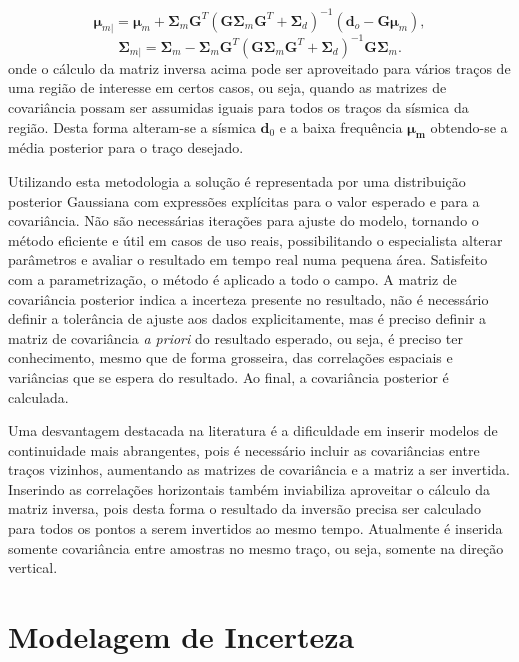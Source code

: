 \begin{equation}
\label{eqn:mapSolution}
\boldsymbol{\mu}_{m|} = \boldsymbol{\mu}_{m} + \boldsymbol{\Sigma}_{m}\boldsymbol{G}^{T}(\boldsymbol{G\Sigma}_{m}\boldsymbol{G}^{T}+\boldsymbol{\Sigma}_{d})^{-1}\left ( \boldsymbol{d}_{o} - \boldsymbol{G\mu}_{m} \right ),
\end{equation}
\begin{equation}
\boldsymbol{\Sigma}_{m|} = \boldsymbol{\Sigma}_{m} - \boldsymbol{\Sigma}_{m}\boldsymbol{G}^{T}(\boldsymbol{G\Sigma}_{m}\boldsymbol{G}^{T}+\boldsymbol{\Sigma}_{d})^{-1}\boldsymbol{G\Sigma}_{m}.
\end{equation} 
onde o cálculo da matriz inversa acima pode ser aproveitado para vários traços
de uma região de interesse em certos casos, ou seja, quando as matrizes de
covariância possam ser assumidas iguais para todos os traços da sísmica da região.
Desta forma alteram-se a sísmica $\mathbf{d}_0$ e a baixa frequência
$\boldsymbol{\mu_m}$ obtendo-se a média posterior para o traço desejado.


Utilizando esta metodologia a solução é representada por uma distribuição
posterior Gaussiana com expressões explícitas para o valor esperado e para a
covariância. Não são necessárias iterações para ajuste do modelo, tornando o
método eficiente e útil em casos de uso reais, possibilitando o especialista
alterar parâmetros e avaliar o resultado em tempo real numa pequena área.
Satisfeito com a parametrização, o método é aplicado a todo o campo. A matriz de
covariância posterior indica a incerteza presente no resultado, não é necessário
definir a tolerância de ajuste aos dados explicitamente, mas é preciso definir a
matriz de covariância \textit{a priori} do resultado esperado, ou seja, é
preciso ter conhecimento, mesmo que de forma grosseira, das correlações espaciais e
variâncias que se espera do resultado. Ao final, a covariância posterior é
calculada.

Uma desvantagem destacada na literatura é a dificuldade em inserir modelos de
continuidade mais abrangentes, pois é necessário incluir as covariâncias entre
traços vizinhos, aumentando as matrizes de covariância e a matriz a ser
invertida. Inserindo as correlações horizontais também inviabiliza aproveitar o
cálculo da matriz inversa, pois desta forma o resultado da inversão precisa ser
calculado para todos os pontos a serem invertidos ao mesmo tempo.
Atualmente é inserida somente covariância entre amostras no mesmo traço, ou
seja, somente na direção vertical.

\section{Modelagem de Incerteza}

